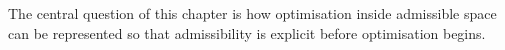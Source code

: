 The central question of this chapter is how optimisation inside admissible space can be represented so that admissibility is explicit before optimisation begins.
